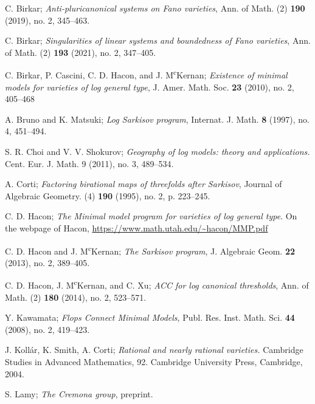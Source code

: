 \documentclass[11pt]{amsart}
\begin{document}
\begin{thebibliography}{99}
   C. Birkar;
  \textit{Anti-pluricanonical systems on Fano varieties}, Ann. of Math. (2) \textbf{190} (2019), no. 2,  345--463.

  C. Birkar;
  \textit{Singularities of linear systems and boundedness of Fano varieties},
  Ann. of Math. (2) \textbf{193} (2021), no. 2, 347–405.

  C. Birkar, P. Cascini, C. D. Hacon, and J. M\textsuperscript{c}Kernan;  \textit{Existence of minimal models for varieties of log general type}, J. Amer. Math. Soc. \textbf{23} (2010), no. 2, 405--468

  A. Bruno and K. Matsuki; \textit{Log {S}arkisov program},
  Internat. J. Math. \textbf{8} (1997), no. 4, 451–494.

  S. R. Choi and V. V. Shokurov; \textit{Geography of log models: theory and applications.}
  Cent. Eur. J. Math. 9 (2011), no. 3, 489--534.

   A. Corti;
  \textit{Factoring birational maps of threefolds after {{Sarkisov}}},
  Journal of Algebraic Geometry. (4) \textbf{190} (1995), no. 2, p. 223--245.

  C. D. Hacon;
  \textit{The {{Minimal}} model program for {{varieties}} of log general type}. On the webpage of Hacon,
  \url{https://www.math.utah.edu/~hacon/MMP.pdf}

  C. D. Hacon and J. M\textsuperscript{c}Kernan;
  \textit{The {{Sarkisov}} program},
  J. Algebraic Geom. \textbf{22} (2013), no. 2, 389–405.

   C. D. Hacon, J. M\textsuperscript{c}Kernan, and C. Xu; \textit{ACC for log canonical thresholds}, Ann. of Math. (2) \textbf{180} (2014), no. 2, 523--571.

  Y. Kawamata;
  \textit{Flops {{Connect Minimal Models}}},
  Publ. Res. Inst. Math. Sci. \textbf{44} (2008), no. 2, 419–423.

  J. Koll\'{a}r, K. Smith, A. Corti; \textit{Rational and nearly rational varieties.} Cambridge Studies in Advanced Mathematics, 92. Cambridge University Press, Cambridge, 2004.

   S. Lamy; \textit{The Cremona group}, preprint.


\end{thebibliography}
\end{document}

